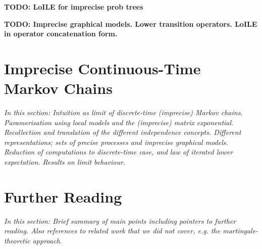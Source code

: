 \documentclass[11pt]{book}
\begin{document}
{\bf TODO: LoILE for imprecise prob trees}

{\bf TODO: Imprecise graphical models. Lower transition operators. LoILE in operator concatenation form. }

\section{Imprecise Continuous-Time Markov Chains}

\emph{In this section: Intuition as limit of discrete-time (imprecise) Markov chains. Paramerisation using local models and the (imprecise) matrix exponential. Recollection and translation of the different independence concepts. Different representations; sets of precise processes and imprecise graphical models. Reduction of computations to discrete-time case, and law of iterated lower expectation. Results on limit behaviour.}

\section{Further Reading}

\emph{In this section: Brief summary of main points including pointers to further reading. Also references to related work that we did not cover, e.g. the martingale-theoretic approach.}
\end{document}
